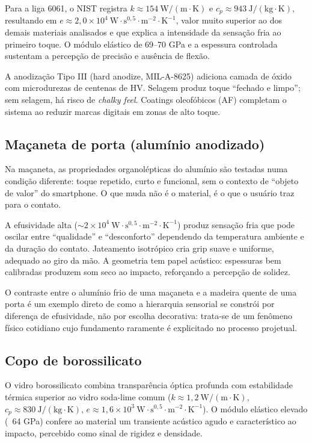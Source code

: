 \documentclass[
  12pt,
  a4paper,
  oneside,
  brazil,
  chapter=TITLE
]{article}
\begin{document}
Para a liga 6061, o NIST registra $k \approx 154\ \mathrm{W/(m \cdot K)}$ e
$c_p \approx 943\ \mathrm{J/(kg \cdot K)}$, resultando em
$e \approx 2{,}0 \times 10^{4}\ \mathrm{W \cdot s^{0{,}5} \cdot m^{-2} \cdot K^{-1}}$,
valor muito superior ao dos demais materiais analisados e que explica a intensidade da
sensação fria ao primeiro toque. O módulo elástico de 69--70 GPa e a espessura controlada
sustentam a percepção de precisão e ausência de flexão.

A anodização Tipo III (hard anodize, MIL-A-8625) adiciona camada de óxido com microdurezas
de centenas de HV. Selagem produz toque ``fechado e limpo''; sem selagem, há risco de
\textit{chalky feel}. Coatings oleofóbicos (AF) completam o sistema ao reduzir marcas
digitais em zonas de alto toque.

\subsection{Maçaneta de porta (alumínio anodizado)}

Na maçaneta, as propriedades organolépticas do alumínio são testadas numa condição
diferente: toque repetido, curto e funcional, sem o contexto de ``objeto de valor'' do
smartphone. O que muda não é o material, é o que o usuário traz para o contato.

A efusividade alta
(${\sim}2 \times 10^{4}\ \mathrm{W \cdot s^{0{,}5} \cdot m^{-2} \cdot K^{-1}}$)
produz sensação fria que pode oscilar entre ``qualidade'' e ``desconforto'' dependendo da
temperatura ambiente e da duração do contato. Jateamento isotrópico cria grip suave e
uniforme, adequado ao giro da mão. A geometria tem papel acústico: espessuras bem
calibradas produzem som seco ao impacto, reforçando a percepção de solidez.

O contraste entre o alumínio frio de uma maçaneta e a madeira quente de uma porta é um
exemplo direto de como a hierarquia sensorial se constrói por diferença de efusividade,
não por escolha decorativa: trata-se de um fenômeno físico cotidiano cujo fundamento
raramente é explicitado no processo projetual.

\subsection{Copo de borossilicato}

O vidro borossilicato combina transparência óptica profunda com estabilidade térmica
superior ao vidro soda-lime comum ($k \approx 1{,}2\ \mathrm{W/(m \cdot K)}$,
$c_p \approx 830\ \mathrm{J/(kg \cdot K)}$,
$e \approx 1{,}6 \times 10^{3}\ \mathrm{W \cdot s^{0{,}5} \cdot m^{-2} \cdot K^{-1}}$).
O módulo elástico elevado (~64 GPa) confere ao material um transiente acústico agudo e
característico ao impacto, percebido como sinal de rigidez e densidade.
\end{document}
